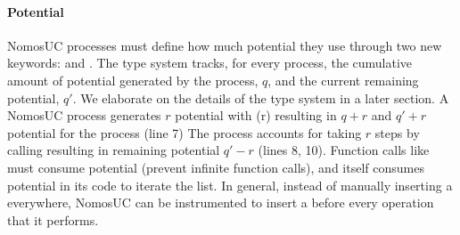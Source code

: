 \paragraph{Potential}
NomosUC processes must define how much potential they use through two new keywords: \inline{$\ngenpot$} and \inline{$\ntick$}.
The type system tracks, for every process, the cumulative amount of potential generated by the process, $q$, and the current remaining potential, $q'$. We elaborate on the details of the type system in a later section.
A NomosUC process generates $r$ potential with \inline{$\ngenpot$}(r) resulting in $q+r$ and $q'+r$ potential for the process (line 7)
The process accounts for taking $r$ steps by calling  resulting in remaining potential $q'-r$ (lines 8, 10).
Function calls like  must consume potential (prevent infinite function calls), and  itself consumes potential in its code to iterate the list.
In general, instead of manually inserting a \itick everywhere, NomosUC can be instrumented to insert a \itick before every operation that it performs.


